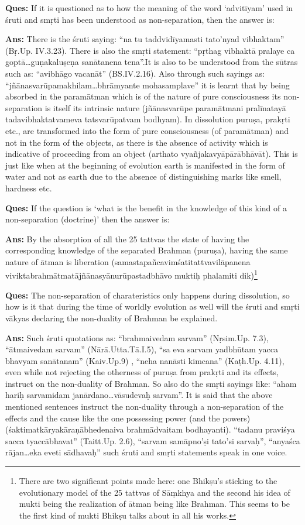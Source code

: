 \textbf{Ques:} If it is questioned as to how the meaning of the word ‘advitīyam’ used in śruti and smṛti has been understood as non-separation, then the answer is: 

\textbf{Ans:} There is the śruti saying: “na tu taddvidīyamasti tato’nyad vibhaktam” (Bṛ.Up. IV.3.23). There is also the smṛti statement: “pṛthag vibhaktā pralaye ca goptā…guṇakaluṣeṇa sanātanena tena”.It is also to be understood from the sūtras such as: “avibhāgo vacanāt” (BS.IV.2.16). Also through such sayings as: “jñānasvarūpamakhilam…bhrāmyante mohasamplave” it is learnt that by being absorbed in the paramātman which is of the nature of pure consciousness its non-separation is itself its intrinsic nature (jñānasvarūpe paramātmani pralīnatayā tadavibhaktatvameva tatsvarūpatvam bodhyam). In dissolution puruṣa, prakṛti etc., are transformed into the form of pure consciousness (of paramātman) and not in the form of the objects, as there is the absence of activity which is indicative of proceeding from an object (arthato vyañjakavyāpārābhāvāt). This is just like when at the beginning of evolution earth is manifested in the form of water and not as earth due to the absence of distinguishing marks like smell, hardness etc. 

\textbf{Ques:} If the question is ‘what is the benefit in the knowledge of this kind of a non-separation (doctrine)’ then the answer is: 

\textbf{Ans:} By the absorption of all the 25 tattvas the state of having the corresponding knowledge of the separated Brahman (puruṣa), having the same nature of ātman is liberation (samastapañcavimśatitattvavilāpanena viviktabrahmātmatājñānasyānurūpastadbhāvo muktiḥ phalamiti dik)\footnote{There are two significant points made here: one Bhikṣu’s sticking to the evolutionary model of the 25 tattvas of Sāṃkhya and the second his idea of mukti being the realization of ātman being like Brahman. This seems to be the first kind of mukti Bhikṣu talks about in all his works.}

\textbf{Ques:} The non-separation of charateristics only happens during dissolution, so how is it that during the time of worldly evolution as well will the śruti and smṛti vākyas declaring the non-duality of Brahman be explained. 

\textbf{Ans:} Such śruti quotations as: “brahmaivedam sarvam” (Nṛsim.Up. 7.3), “ātmaivedam sarvam” (Nārā.Utta.Tā.I.5), “sa eva sarvam yadbhūtam yacca bhavyam sanātanam” (Kaiv.Up.9) , “neha nanāsti kimcana” (Kaṭh.Up. 4.11), even while not rejecting the otherness of puruṣa from prakṛti and its effects, instruct on the non-duality of Brahman. So also do the smṛti sayings like: “aham hariḥ sarvamidam janārdano…vāsudevaḥ sarvam”. It is said that the above mentioned sentences instruct the non-duality through a non-separation of the effects and the cause like the one possessing power (and the powers) (śaktimatkāryakāraṇābhedenaiva brahmādvaitam bodhayanti). “tadanu praviśya sacca tyaccābhavat” (Taitt.Up. 2.6), “sarvam samāpno’ṣi tato’si sarvaḥ”, “anyaśca rājan…eka eveti sādhavaḥ” such śruti and smṛti statements speak in one voice.

